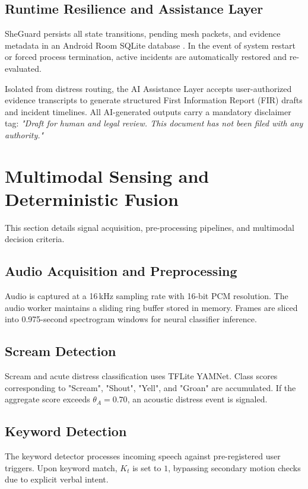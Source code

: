 \documentclass[conference]{IEEEtran}
\begin{document}
\subsection{Runtime Resilience and Assistance Layer}
SheGuard persists all state transitions, pending mesh packets, and evidence metadata in an Android Room SQLite database \cite{android_room}. In the event of system restart or forced process termination, active incidents are automatically restored and re-evaluated.

Isolated from distress routing, the AI Assistance Layer accepts user-authorized evidence transcripts to generate structured First Information Report (FIR) drafts and incident timelines. All AI-generated outputs carry a mandatory disclaimer tag: \textit{"Draft for human and legal review. This document has not been filed with any authority."}

\section{Multimodal Sensing and Deterministic Fusion}
This section details signal acquisition, pre-processing pipelines, and multimodal decision criteria.

\subsection{Audio Acquisition and Preprocessing}
Audio is captured at a 16\,kHz sampling rate with 16-bit PCM resolution. The audio worker maintains a sliding ring buffer stored in memory. Frames are sliced into 0.975-second spectrogram windows for neural classifier inference.

\subsection{Scream Detection}
Scream and acute distress classification uses TFLite YAMNet. Class scores corresponding to "Scream", "Shout", "Yell", and "Groan" are accumulated. If the aggregate score exceeds $\theta_A = 0.70$, an acoustic distress event is signaled.

\subsection{Keyword Detection}
The keyword detector processes incoming speech against pre-registered user triggers. Upon keyword match, $K_t$ is set to $1$, bypassing secondary motion checks due to explicit verbal intent.
\end{document}
